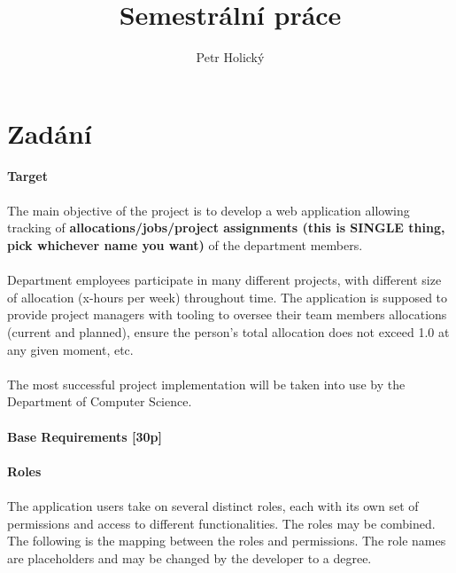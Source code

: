 \documentclass[czech,P5]{thesiskiv}
\author{Petr Holický}
\title{Semestrální práce}
\begin{document}
%
\maketitle
\tableofcontents


\chapter{Zadání}
\textbf{Target}
\\\\
The main objective of the project is to develop a web application allowing tracking of \textbf{allocations/jobs/project assignments (this is SINGLE thing, pick whichever name you want)} of the department members. 
\\\\
Department employees participate in many different projects, with different size of allocation (x-hours per week) throughout time. The application is supposed to provide project managers with tooling to oversee their team members allocations (current and planned), ensure the person’s total allocation does not exceed 1.0 at any given moment, etc. 
\\\\
The most successful project implementation will be taken into use by the Department of Computer Science. 
\\\\
{\LARGE \textbf{Base Requirements [30p]}}
\\\\
\textbf{Roles}
\\\\
The application users take on several distinct roles, each with its own set of permissions and access to different functionalities. The roles may be combined. The following is the mapping between the roles and permissions. The role names are placeholders and may be changed by the developer to a degree. 
\end{document}
